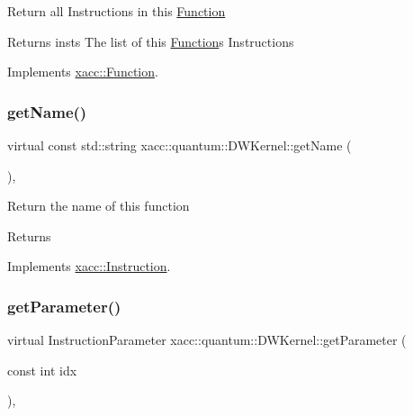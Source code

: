 Return all Instructions in this \hyperlink{a01653}{Function}

\begin{DoxyReturn}{Returns}
insts The list of this \hyperlink{a01653}{Function}\textquotesingle{}s Instructions 
\end{DoxyReturn}


Implements \hyperlink{a01653_aaf80bd3d49113a92b520785572663032}{xacc\+::\+Function}.

\mbox{\label{a01221_a7f0c4d3c73029566561cf56a474bcbbd}} 
\subsubsection{\texorpdfstring{get\+Name()}{getName()}}
{\footnotesize\ttfamily virtual const std\+::string xacc\+::quantum\+::\+D\+W\+Kernel\+::get\+Name (\begin{DoxyParamCaption}{ }\end{DoxyParamCaption})\hspace{0.3cm}{\ttfamily [inline]}, {\ttfamily [virtual]}}

Return the name of this function \begin{DoxyReturn}{Returns}

\end{DoxyReturn}


Implements \hyperlink{a01657_ac7ff23f693e2276edbf3fdac5452792c}{xacc\+::\+Instruction}.

\mbox{\label{a01221_a81711b7db284aba35d6952e4d1d15d41}} 
\subsubsection{\texorpdfstring{get\+Parameter()}{getParameter()}}
{\footnotesize\ttfamily virtual Instruction\+Parameter xacc\+::quantum\+::\+D\+W\+Kernel\+::get\+Parameter (\begin{DoxyParamCaption}\item[{const int}]{idx }\end{DoxyParamCaption})\hspace{0.3cm}{\ttfamily [inline]}, {\ttfamily [virtual]}}

